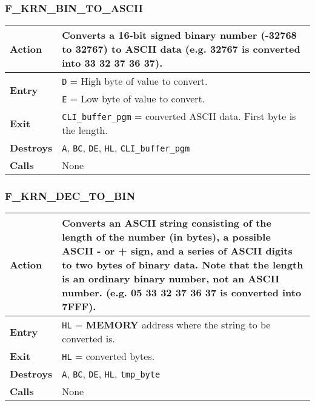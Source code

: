     \subsubsection{F\_KRN\_BIN\_TO\_ASCII}
    \label{func:fkrnbintoascii}
    \begin{tabular}{l p{15cm}}
        \hline\textbf{Action}
        & Converts a 16-bit signed binary number (-32768 to 32767) to ASCII
        data (e.g. 32767 is converted into 33 32 37 36 37).\\
        \hline\multirow[t]{2}{4em}{\textbf{Entry}}
        & \texttt{D} = High byte of value to convert.\\
        & \texttt{E} = Low byte of value to convert.\\
        \hline\textbf{Exit} & \texttt{CLI\_buffer\_pgm} = converted ASCII data.
        First byte is the length.\\
        \hline\textbf{Destroys} & \texttt{A}, \texttt{BC}, \texttt{DE}, 
        \texttt{HL}, \texttt{CLI\_buffer\_pgm}\\
        \hline\textbf{Calls} & None\\
        \hline
    \end{tabular}

    \subsubsection{F\_KRN\_DEC\_TO\_BIN}
    \label{func:fkrndectobin}
    \begin{tabular}{l p{15cm}}
        \hline\textbf{Action}
        & Converts an ASCII string consisting of the length of the number
        (in bytes), a possible ASCII - or + sign, and a series of ASCII
        digits to two bytes of binary data. Note that the length is an
        ordinary binary number, not an ASCII number. (e.g. 05 33 32 37 36 37
        is converted into 7FFF).\\
        \hline\textbf{Entry} & \texttt{HL} = \textbf{MEMORY} address where
        the string to be converted is.\\
        \hline\textbf{Exit} & \texttt{HL} = converted bytes.\\
        \hline\textbf{Destroys} & \texttt{A}, \texttt{BC}, \texttt{DE}, 
        \texttt{HL}, \texttt{tmp\_byte}\\
        \hline\textbf{Calls} & None\\
        \hline
    \end{tabular}

